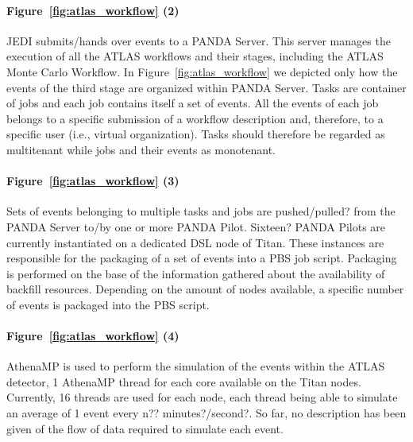 \paragraph{Figure~\ref{fig:atlas_workflow} (2)} JEDI submits/hands over events
to a PANDA Server. This server manages the execution of all the ATLAS workflows
and their stages, including the ATLAS Monte Carlo Workflow. In
Figure~\ref{fig:atlas_workflow} we depicted only how the events of the third
stage are organized within PANDA Server. Tasks are container of jobs and each
job contains itself a set of events. All the events of each job belongs to a
specific submission of a workflow description and, therefore, to a specific user
(i.e., virtual organization). Tasks should therefore be regarded as multitenant
while jobs and their events as monotenant.

\paragraph{Figure~\ref{fig:atlas_workflow} (3)} Sets of events belonging to
multiple tasks and jobs are pushed/pulled? from the PANDA Server to/by one or
more PANDA Pilot. Sixteen? PANDA Pilots are currently instantiated on a
dedicated DSL node of Titan. These instances are responsible for the packaging
of a set of events into a PBS job script. Packaging is performed on the base of
the information gathered about the availability of backfill resources. Depending
on the amount of nodes available, a specific number of events is packaged into
the PBS script.

\paragraph{Figure~\ref{fig:atlas_workflow} (4)} AthenaMP is used to perform the
simulation of the events within the ATLAS detector, 1 AthenaMP thread for each
core available on the Titan nodes. Currently, 16 threads are used for each node,
each thread being able to simulate an average of 1 event every n??
minutes?/second?. So far, no description has been given of the flow of data
required to simulate each event.

